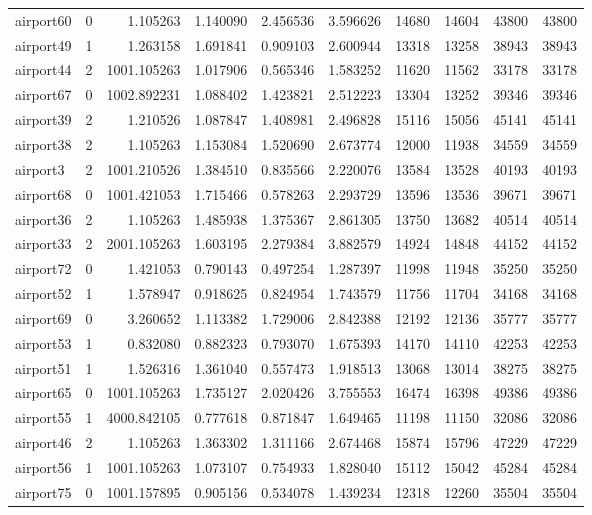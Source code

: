 \begin{longtable}{|l|r|r|r|r|r|r|r|r|r|}
airport60 & 0 & 1.105263 & 1.140090 & 2.456536 & 3.596626 & 14680 & 14604 & 43800 & 43800 \\
airport49 & 1 & 1.263158 & 1.691841 & 0.909103 & 2.600944 & 13318 & 13258 & 38943 & 38943 \\
airport44 & 2 & 1001.105263 & 1.017906 & 0.565346 & 1.583252 & 11620 & 11562 & 33178 & 33178 \\
airport67 & 0 & 1002.892231 & 1.088402 & 1.423821 & 2.512223 & 13304 & 13252 & 39346 & 39346 \\
airport39 & 2 & 1.210526 & 1.087847 & 1.408981 & 2.496828 & 15116 & 15056 & 45141 & 45141 \\
airport38 & 2 & 1.105263 & 1.153084 & 1.520690 & 2.673774 & 12000 & 11938 & 34559 & 34559 \\
airport3 & 2 & 1001.210526 & 1.384510 & 0.835566 & 2.220076 & 13584 & 13528 & 40193 & 40193 \\
airport68 & 0 & 1001.421053 & 1.715466 & 0.578263 & 2.293729 & 13596 & 13536 & 39671 & 39671 \\
airport36 & 2 & 1.105263 & 1.485938 & 1.375367 & 2.861305 & 13750 & 13682 & 40514 & 40514 \\
airport33 & 2 & 2001.105263 & 1.603195 & 2.279384 & 3.882579 & 14924 & 14848 & 44152 & 44152 \\
airport72 & 0 & 1.421053 & 0.790143 & 0.497254 & 1.287397 & 11998 & 11948 & 35250 & 35250 \\
airport52 & 1 & 1.578947 & 0.918625 & 0.824954 & 1.743579 & 11756 & 11704 & 34168 & 34168 \\
airport69 & 0 & 3.260652 & 1.113382 & 1.729006 & 2.842388 & 12192 & 12136 & 35777 & 35777 \\
airport53 & 1 & 0.832080 & 0.882323 & 0.793070 & 1.675393 & 14170 & 14110 & 42253 & 42253 \\
airport51 & 1 & 1.526316 & 1.361040 & 0.557473 & 1.918513 & 13068 & 13014 & 38275 & 38275 \\
airport65 & 0 & 1001.105263 & 1.735127 & 2.020426 & 3.755553 & 16474 & 16398 & 49386 & 49386 \\
airport55 & 1 & 4000.842105 & 0.777618 & 0.871847 & 1.649465 & 11198 & 11150 & 32086 & 32086 \\
airport46 & 2 & 1.105263 & 1.363302 & 1.311166 & 2.674468 & 15874 & 15796 & 47229 & 47229 \\
airport56 & 1 & 1001.105263 & 1.073107 & 0.754933 & 1.828040 & 15112 & 15042 & 45284 & 45284 \\
airport75 & 0 & 1001.157895 & 0.905156 & 0.534078 & 1.439234 & 12318 & 12260 & 35504 & 35504 \\

\end{longtable}
